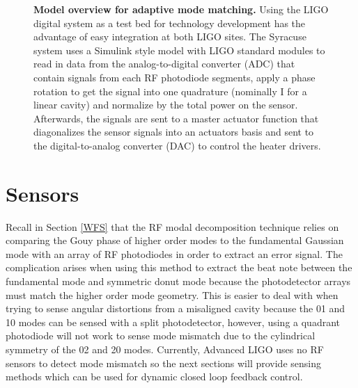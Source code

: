	\begin{figure}[h]
		\centering
		\caption[Model overview for adaptive mode matching.]
		{\textbf{Model overview for adaptive mode matching.} 
			Using the LIGO digital system as a test bed for technology development has the advantage of easy integration at both LIGO sites.  The Syracuse system uses a Simulink style model with LIGO standard modules to read in data from the analog-to-digital converter (ADC) that contain signals from each RF photodiode segments, apply a phase rotation to get the signal into one quadrature (nominally I for a linear cavity) and normalize by the total power on the sensor.  Afterwards, the signals are sent to a master actuator function that diagonalizes the sensor signals into an actuators basis and sent to the digital-to-analog converter (DAC) to control the heater drivers.
		}
		\label{fig:AMM_overview}
	\end{figure}

\section{Sensors}
	Recall in Section \ref{WFS} that the RF modal decomposition technique relies on comparing the Gouy phase of higher order modes to the fundamental Gaussian mode with an array of RF photodiodes in order to extract an error signal. The complication arises when using this method to extract the beat note between the fundamental mode and symmetric donut mode because the photodetector arrays must match the higher order mode geometry.  This is easier to deal with when trying to sense angular distortions from a misaligned cavity because the 01 and 10 modes can be sensed with a split photodetector, however, using a quadrant photodiode will not work to sense mode mismatch due to the cylindrical symmetry of the 02 and 20 modes. Currently, Advanced LIGO uses no RF sensors to detect mode mismatch so the next sections will provide sensing methods which can be used for dynamic closed loop feedback control.
	
